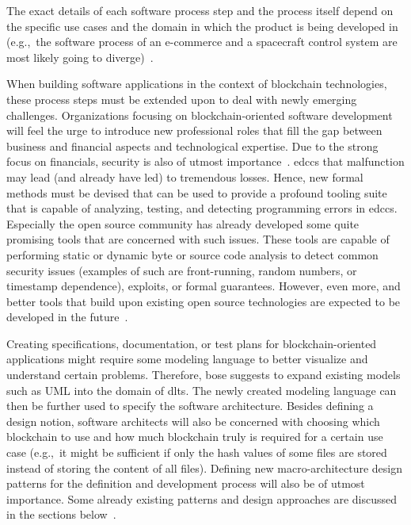 The exact details of each software process step and the process itself depend on the specific use cases and the domain in which the product is being developed in (e.g.,\ the software process of an e-commerce and a spacecraft control system are most likely going to diverge)~\cite{software_engineering}.

When building software applications in the context of blockchain technologies, these process steps must be extended upon to deal with newly emerging challenges. Organizations focusing on blockchain-oriented software development will feel the urge to introduce new professional roles that fill the gap between business and financial aspects and technological expertise. Due to the strong focus on financials, security is also of utmost importance~\cite{blockchain_oriented_software_engineering}. \glspl{edcc} that malfunction may lead (and already have led) to tremendous losses. Hence, new formal methods must be devised that can be used to provide a profound tooling suite that is capable of analyzing, testing, and detecting programming errors in \glspl{edcc}. Especially the open source community has already developed some quite promising tools that are concerned with such issues. These tools are capable of performing static or dynamic byte or source code analysis to detect common security issues (examples of such are front-running, random numbers, or timestamp dependence), exploits, or formal guarantees. However, even more, and better tools that build upon existing open source technologies are expected to be developed in the future~\cite{tools_for_analyzing_smart_contracts}.

Creating specifications, documentation, or test plans for blockchain-oriented applications might require some modeling language to better visualize and understand certain problems. Therefore, \gls{bose} suggests to expand existing models such as UML into the domain of \glspl{dlt}. The newly created modeling language can then be further used to specify the software architecture. Besides defining a design notion, software architects will also be concerned with choosing which blockchain to use and how much blockchain truly is required for a certain use case (e.g.,\ it might be sufficient if only the hash values of some files are stored instead of storing the content of all files). Defining new macro-architecture design patterns for the definition and development process will also be of utmost importance. Some already existing patterns and design approaches are discussed in the sections below~\cite{blockchain_oriented_software_engineering,how_much_blockchain_do_you_need}.


